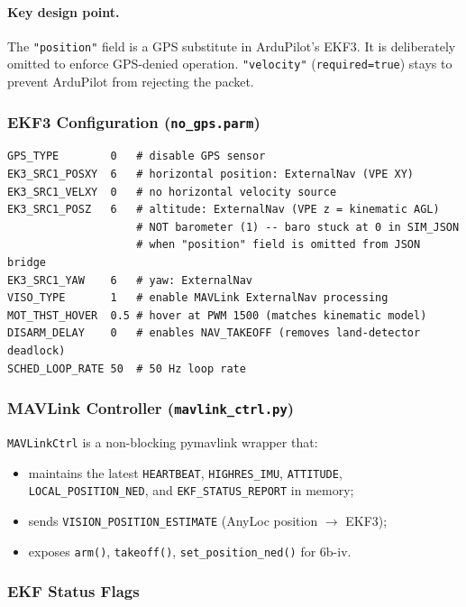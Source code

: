 \documentclass[11pt,a4paper]{article}
\begin{document}
\paragraph{Key design point.} The \texttt{"position"} field is a GPS substitute in
ArduPilot's EKF3.  It is deliberately omitted to enforce GPS-denied operation.
\texttt{"velocity"} (\texttt{required=true}) stays to prevent ArduPilot from rejecting the
packet.

\subsubsection*{EKF3 Configuration (\texttt{no\_gps.parm})}

\begin{lstlisting}[caption={SITL parameter file for GPS-denied operation (no\_gps.parm)}]
GPS_TYPE        0   # disable GPS sensor
EK3_SRC1_POSXY  6   # horizontal position: ExternalNav (VPE XY)
EK3_SRC1_VELXY  0   # no horizontal velocity source
EK3_SRC1_POSZ   6   # altitude: ExternalNav (VPE z = kinematic AGL)
                    # NOT barometer (1) -- baro stuck at 0 in SIM_JSON
                    # when "position" field is omitted from JSON bridge
EK3_SRC1_YAW    6   # yaw: ExternalNav
VISO_TYPE       1   # enable MAVLink ExternalNav processing
MOT_THST_HOVER  0.5 # hover at PWM 1500 (matches kinematic model)
DISARM_DELAY    0   # enables NAV_TAKEOFF (removes land-detector deadlock)
SCHED_LOOP_RATE 50  # 50 Hz loop rate
\end{lstlisting}

\subsubsection*{MAVLink Controller (\texttt{mavlink\_ctrl.py})}

\texttt{MAVLinkCtrl} is a non-blocking pymavlink wrapper that:
\begin{itemize}
  \item maintains the latest \texttt{HEARTBEAT}, \texttt{HIGHRES\_IMU}, \texttt{ATTITUDE},
        \texttt{LOCAL\_POSITION\_NED}, and \texttt{EKF\_STATUS\_REPORT} in memory;
  \item sends \texttt{VISION\_POSITION\_ESTIMATE} (AnyLoc position \ensuremath{\to} EKF3);
  \item exposes \texttt{arm()}, \texttt{takeoff()}, \texttt{set\_position\_ned()} for 6b-iv.
\end{itemize}

\subsubsection*{EKF Status Flags}
\end{document}
